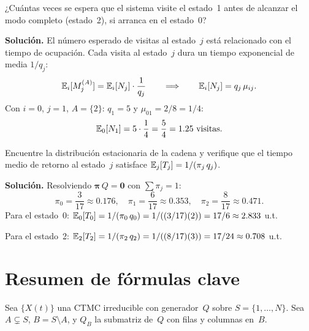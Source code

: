 \documentclass[11pt, letterpaper]{article}
\begin{document}
\begin{ejemplobox}
  ¿Cuántas veces se espera que el sistema visite el estado~1 antes de
  alcanzar el modo completo (estado~2), si arranca en el estado~0?

  \medskip
  \textbf{Solución.}  El número esperado de visitas al estado~$j$ está
  relacionado con el tiempo de ocupación.  Cada visita al estado~$j$
  dura un tiempo exponencial de media $1/q_j$:
  \[
    \mathbb{E}_i[M_j^{(A)}] = \mathbb{E}_i[N_j]\cdot\frac{1}{q_j}
    \qquad\Longrightarrow\qquad
    \mathbb{E}_i[N_j] = q_j\,\mu_{ij}.
  \]
  Con $i=0$, $j=1$, $A=\{2\}$: $q_1=5$ y $\mu_{01}=2/8=1/4$:
  \[
    \mathbb{E}_0[N_1] = 5\cdot\frac{1}{4} = \frac{5}{4} = 1.25 \text{ visitas.}
  \]
\end{ejemplobox}

\begin{ejemplobox}
  Encuentre la distribución estacionaria de la cadena y verifique
  que el tiempo medio de retorno al estado~$j$ satisface
  $\mathbb{E}_j[T_j] = 1/(\pi_j\,q_j)$.

  \medskip
  \textbf{Solución.}  Resolviendo $\boldsymbol{\pi}\,Q=\mathbf{0}$
  con $\sum\pi_j=1$:
  \[
    \pi_0 = \frac{3}{17}\approx 0.176, \quad
    \pi_1 = \frac{6}{17}\approx 0.353, \quad
    \pi_2 = \frac{8}{17}\approx 0.471.
  \]
  Para el estado~0: $\mathbb{E}_0[T_0] = 1/(\pi_0\,q_0) = 1/((3/17)(2)) = 17/6 \approx 2.833$ u.t.

  Para el estado~2: $\mathbb{E}_2[T_2] = 1/(\pi_2\,q_2) = 1/((8/17)(3)) = 17/24 \approx 0.708$ u.t.
\end{ejemplobox}

\section{Resumen de fórmulas clave}

Sea $\{X(t)\}$ una CTMC irreducible con generador~$Q$ sobre
$S=\{1,\ldots,N\}$.  Sea $A\subsetneq S$, $B=S\setminus A$,
y $Q_B$ la submatriz de~$Q$ con filas y columnas en~$B$.
\end{document}
